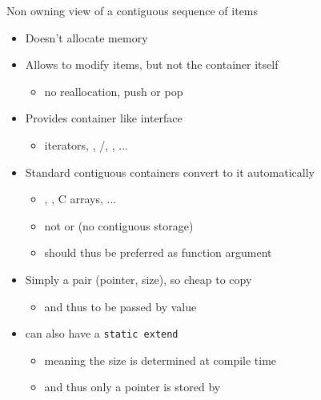 \begin{frame}[fragile]
  \begin{block}{Non owning view of a contiguous sequence of items}
    \begin{itemize}
    \item Doesn't allocate memory
    \item Allows to modify items, but not the container itself
      \begin{itemize}
      \item no reallocation, push or pop
      \end{itemize}
    \item Provides container like interface
      \begin{itemize}
      \item iterators, , /, , ...
      \end{itemize}
    \item Standard contiguous containers convert to it automatically
      \begin{itemize}
      \item {}, , C arrays, ...
      \item not  or  (no contiguous storage)
      \item {} should thus be preferred as function argument
      \end{itemize}
    \item Simply a pair (pointer, size), so cheap to copy
      \begin{itemize}
      \item and thus to be passed by value
      \end{itemize}
    \item {} can also have a \texttt{static extend}
      \begin{itemize}
      \item meaning the size is determined at compile time
      \item and thus only a pointer is stored by 
      \end{itemize}
    \end{itemize}
  \end{block}
\end{frame}

